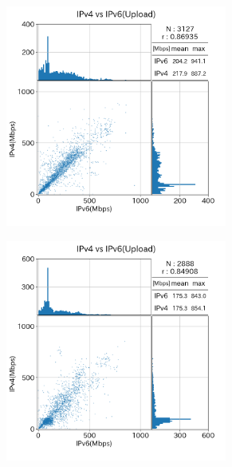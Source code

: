 \begin{figure}[htbp]
    \begin{center}
        \begin{minipage}[t]{0.48\textwidth}
            \begin{center}
                \begin{subfigure}[b]{\textwidth}
                    \centering
                    \includegraphics[width=0.8\textwidth]{fig/old_IPv4aaS_ul.png}
                    \label{old_IPv4aaS_ul}
                \end{subfigure}
                \begin{subfigure}[b]{\textwidth}
                    \centering
                    \includegraphics[width=0.8\textwidth]{fig/old_mix_ul.png}

\end{subfigure}
\end{center}
\end{minipage}
\end{center}
\end{figure}
